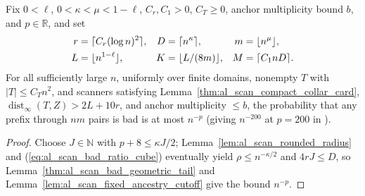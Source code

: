 \begin{lemma}
    \label{thm:al_scan_bad_history_inverse_power}
    \leanok
    Fix $0<\ell$, $0<\kappa<\mu<1-\ell$, $C_r,C_1>0$, $C_T\ge0$,
    anchor multiplicity bound $b$, and $p\in\mathbb R$, and set
    \begin{align}
        r & =\lceil C_r(\log n)^2\rceil, & D                                                       & =\lceil n^\kappa\rceil,
          & m                            & =\lfloor n^\mu\rfloor,                           \notag                           \\
        L & =\lfloor n^{1-\ell}\rfloor,  & K                                                       & =\lfloor L/(8m)\rfloor,
          & M                            & =\lceil C_1nD\rceil.
        \label{eq:al_scan_bad_history_scales}
    \end{align}
    For all sufficiently large $n$, uniformly over finite domains,
    nonempty $T$ with $|T|\le C_Tn^2$, and scanners satisfying Lemma~\ref{thm:al_scan_compact_collar_card}, $\operatorname{dist}_\infty(T,Z)>2L+10r$, and anchor multiplicity $\le b$, the probability that any prefix through $nm$ pairs is bad is at most $n^{-p}$ (giving $n^{-200}$ at $p=200$ in \cite[Lemma~9.1]{OpenAI2026AreaLaw}).
\end{lemma}
\begin{proof}\leanok
    Choose $J\in\mathbb N$ with $p+8\le\kappa J/2$; Lemma~\ref{lem:al_scan_rounded_radius} and (\ref{eq:al_scan_bad_ratio_cube}) eventually yield $\rho\le n^{-\kappa/2}$ and $4rJ\le D$, so Lemma~\ref{thm:al_scan_bad_geometric_tail} and Lemma~\ref{lem:al_scan_fixed_ancestry_cutoff} give the bound $n^{-p}$.
\end{proof}


